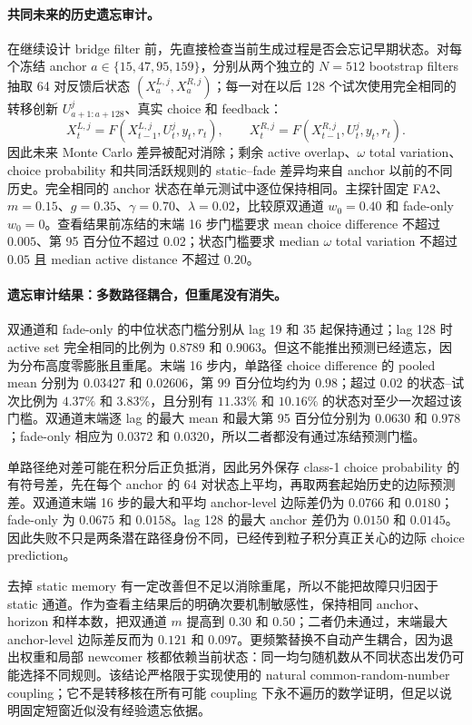 \paragraph{共同未来的历史遗忘审计。}
在继续设计 bridge filter 前，先直接检查当前生成过程是否会忘记早期状态。对每个冻结 anchor $a\in\{15,47,95,159\}$，分别从两个独立的 $N=512$ bootstrap filters 抽取 64 对反馈后状态 $(X_a^{L,j},X_a^{R,j})$；每一对在以后 128 个试次使用完全相同的转移创新 $U_{a+1:a+128}^{j}$、真实 choice 和 feedback：
\begin{equation}
 X_{t}^{L,j}=F(X_{t-1}^{L,j},U_t^j,y_t,r_t),
 \qquad
 X_{t}^{R,j}=F(X_{t-1}^{R,j},U_t^j,y_t,r_t).
 \label{eq:model0804-coupled-forgetting}
\end{equation}
因此未来 Monte Carlo 差异被配对消除；剩余 active overlap、$\omega$ total variation、choice probability 和共同活跃规则的 static--fade 差异均来自 anchor 以前的不同历史。完全相同的 anchor 状态在单元测试中逐位保持相同。主探针固定 FA2、$m=0.15$、$g=0.35$、$\gamma=0.70$、$\lambda=0.02$，比较原双通道 $w_0=0.40$ 和 fade-only $w_0=0$。查看结果前冻结的末端 16 步门槛要求 mean choice difference 不超过 $0.005$、第 95 百分位不超过 $0.02$；状态门槛要求 median $\omega$ total variation 不超过 $0.05$ 且 median active distance 不超过 $0.20$。

\paragraph{遗忘审计结果：多数路径耦合，但重尾没有消失。}
双通道和 fade-only 的中位状态门槛分别从 lag 19 和 35 起保持通过；lag 128 时 active set 完全相同的比例为 $0.8789$ 和 $0.9063$。但这不能推出预测已经遗忘，因为分布高度零膨胀且重尾。末端 16 步内，单路径 choice difference 的 pooled mean 分别为 $0.03427$ 和 $0.02606$，第 99 百分位均约为 $0.98$；超过 $0.02$ 的状态--试次比例为 $4.37\%$ 和 $3.83\%$，且分别有 $11.33\%$ 和 $10.16\%$ 的状态对至少一次超过该门槛。双通道末端逐 lag 的最大 mean 和最大第 95 百分位分别为 $0.0630$ 和 $0.978$；fade-only 相应为 $0.0372$ 和 $0.0320$，所以二者都没有通过冻结预测门槛。

单路径绝对差可能在积分后正负抵消，因此另外保存 class-1 choice probability 的有符号差，先在每个 anchor 的 64 对状态上平均，再取两套起始历史的边际预测差。双通道末端 16 步的最大和平均 anchor-level 边际差仍为 $0.0766$ 和 $0.0180$；fade-only 为 $0.0675$ 和 $0.0158$。lag 128 的最大 anchor 差仍为 $0.0150$ 和 $0.0145$。因此失败不只是两条潜在路径身份不同，已经传到粒子积分真正关心的边际 choice prediction。

去掉 static memory 有一定改善但不足以消除重尾，所以不能把故障只归因于 static 通道。作为查看主结果后的明确次要机制敏感性，保持相同 anchor、horizon 和样本数，把双通道 $m$ 提高到 $0.30$ 和 $0.50$；二者仍未通过，末端最大 anchor-level 边际差反而为 $0.121$ 和 $0.097$。更频繁替换不自动产生耦合，因为退出权重和局部 newcomer 核都依赖当前状态：同一均匀随机数从不同状态出发仍可能选择不同规则。该结论严格限于实现使用的 natural common-random-number coupling；它不是转移核在所有可能 coupling 下永不遍历的数学证明，但足以说明固定短窗近似没有经验遗忘依据。

